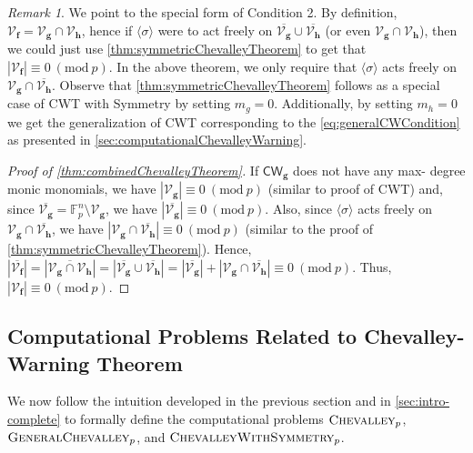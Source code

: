 \documentclass[10pt,a4paper]{article}
\theoremstyle{definition}
\theoremstyle{remark}
\newtheorem{remark}[theorem]{Remark}
\newcommand{\inparen}[1]{\left ( #1 \right )}
\renewcommand{\mod}[1]{~\inparen{\mathrm{mod}~#1}}
\def\abs#1{\left|#1\right|}
\def\a#1{\langle#1\rangle}
\newcommand{\F}{\ensuremath{\mathbb{F}}}
\newcommand{\calV}{\mathcal{V}}
\newcommand{\vecf}{\ensuremath{\boldsymbol{f}}}
\newcommand{\vecg}{\ensuremath{\boldsymbol{g}}}
\newcommand{\vech}{\ensuremath{\boldsymbol{h}}}
\newcommand{\pnum}{p}
\newcommand{\CWT}{CWT\xspace}
\newcommand{\lChevalleyp}{\textsc{GeneralChevalley}_{\pnum}}
\newcommand{\cChevalleyp}{\textsc{ChevalleyWithSymmetry}_{\pnum}}
\newcommand{\eChevalleyp}{\textsc{Chevalley}_{\pnum}}
\newcommand{\CW}{\mathsf{CW}}
\begin{document}
\begin{remark} \label{rem:conditionsOfChevalleyWithSymmetry}
    We point to the special form of Condition 2. By definition,
  $\calV_{\vecf} = \calV_{\vecg} \cap \calV_{\vech}$, hence if $\a{\sigma}$
  were to act freely on $\overline{\calV_{\vecg}} \cup \overline{\calV_{\vech}}$ (or even $\calV_{\vecg} \cap \calV_{\vech}$), then we could just
  use \autoref{thm:symmetricChevalleyTheorem} to get that
  $\abs{\calV_{\vecf}} \equiv 0 \mod{p}$. In the above theorem,
  we only require that $\a{\sigma}$ acts freely on
  $\calV_{\vecg} \cap \overline{\calV_{\vech}}$. Observe that
  \autoref{thm:symmetricChevalleyTheorem} follows as a special case of \CWT with
  Symmetry by setting $m_g = 0$. Additionally, by setting $m_h = 0$ we get the generalization of \CWT corresponding to the
  \eqref{eq:generalCWCondition} as presented in
  \autoref{sec:computationalChevalleyWarning}.
\end{remark}

\begin{proof}[Proof of \autoref{thm:combinedChevalleyTheorem}]
  	If $\CW_{\vecg}$ does not have any max-
	degree monic monomials, we have $\abs{\calV_{\vecg}} \equiv 0 \mod{p}$ (similar to proof of \CWT) and, since
	$\overline{\calV_{\vecg}} = \F_p^n \setminus \calV_{\vecg}$, we have $\abs{\overline{\calV_{\vecg}}} \equiv 0 \mod{p}$. Also,
	since $\a{\sigma}$ acts freely on $\calV_{\vecg} \cap
	\overline{\calV_{\vech}}$, we have
	$\abs{\calV_{\vecg} \cap \overline{\calV_{\vech}}} \equiv 0 \mod{p}$ (similar to the proof of
	\autoref{thm:symmetricChevalleyTheorem}). Hence,
	$\abs{\overline{\calV_{\vecf}}} = \abs{\overline{\calV_{\vecg} \cap
	\calV_{\vech}}}  = \abs{\overline{\calV_{\vecg}} \cup
	\overline{\calV_{\vech}}} = \abs{\overline{\calV_{\vecg}}} +
	\abs{\calV_{\vecg} \cap \overline{\calV_{\vech}}} \equiv  0 \mod{p}$. Thus,
	$\abs{\calV_{\vecf}} \equiv 0 \mod{p}$.
\end{proof}

\subsection{Computational Problems Related to Chevalley-Warning Theorem}
\label{sec:computationalChevalleyWarningFormal}

  We now follow the intuition developed in the previous section and in
\autoref{sec:intro-complete} to formally define the computational problems
$\eChevalleyp$, $\lChevalleyp$, and $\cChevalleyp$.
\medskip
\end{document}
